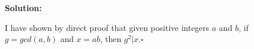 \documentclass{article}
\newenvironment{solution}
{
\par
\color{blue}
\textbf{Solution:}
}
{
\par
}
\begin{document}
\begin{enumerate}
\begin{solution}
I have shown by direct proof that given positive integers $a$ and $b$, if $g = gcd(a, b)$ and $x = ab$, then $g^2 | x. \square$
\end{solution}



\end{enumerate}
\end{document}
